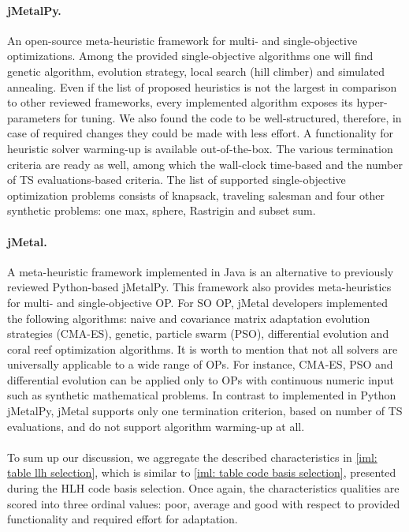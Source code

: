 \paragraph{jMetalPy.} An open-source meta-heuristic framework for multi- and single-objective optimizations. Among the provided single-objective algorithms one will find genetic algorithm, evolution strategy, local search (hill climber) and simulated annealing. Even if the list of proposed heuristics is not the largest in comparison to other reviewed frameworks, every implemented algorithm exposes its hyper-parameters for tuning. We also found the code to be well-structured, therefore, in case of required changes they could be made with less effort. A functionality for heuristic solver warming-up is available out-of-the-box. The various termination criteria are ready as well, among which the wall-clock time-based and the number of TS evaluations-based criteria. The list of supported single-objective optimization problems consists of knapsack, traveling salesman and four other synthetic problems: one max, sphere, Rastrigin and subset sum.

\paragraph{jMetal.} A meta-heuristic framework implemented in Java is an alternative to previously reviewed Python-based jMetalPy. This framework also provides meta-heuristics for multi- and single-objective OP. For SO OP, jMetal developers implemented the following algorithms: naive and covariance matrix adaptation evolution strategies (CMA-ES), genetic, particle swarm (PSO), differential evolution and coral reef optimization algorithms. It is worth to mention that not all solvers are universally applicable to a wide range of OPs. For instance, CMA-ES, PSO and differential evolution can be applied only to OPs with continuous numeric input such as synthetic mathematical problems. In contrast to implemented in Python jMetalPy, jMetal supports only one termination criterion, based on number of TS evaluations, and do not support algorithm warming-up at all.

\paragraph{} To sum up our discussion, we aggregate the described characteristics in \cref{iml: table llh selection}, which is similar to \cref{iml: table code basis selection}, presented during the HLH code basis selection. Once again, the characteristics qualities are scored into three ordinal values: poor, average and good with respect to provided functionality and required effort for adaptation.

